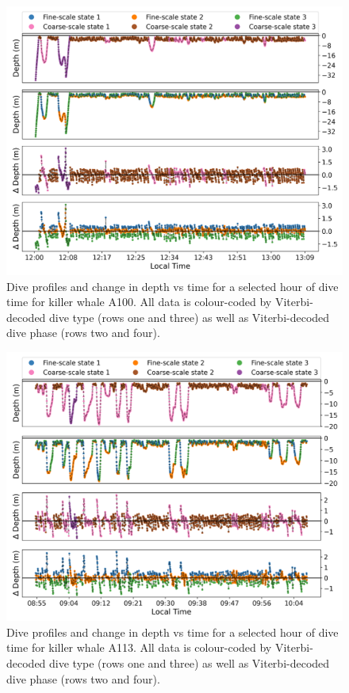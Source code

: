 \documentclass[12pt]{article}
\begin{document}
\begin{figure}[H]
    \centering
    \includegraphics[width=6.5in]{../plt/decoded_dives_kw_A100_K_3_3_nWhales_8.png}
    \caption{Dive profiles and change in depth vs time for a selected hour of dive time for killer whale A100. All data is colour-coded by Viterbi-decoded dive type (rows one and three) as well as Viterbi-decoded dive phase (rows two and four).}
    \label{fig:A100}
\end{figure}

\begin{figure}[H]
    \centering
    \includegraphics[width=6.5in]{../plt/decoded_dives_kw_A113_K_3_3_nWhales_8.png}
    \caption{Dive profiles and change in depth vs time for a selected hour of dive time for killer whale A113. All data is colour-coded by Viterbi-decoded dive type (rows one and three) as well as Viterbi-decoded dive phase (rows two and four).}
    \label{fig:A113}
\end{figure}
\end{document}
